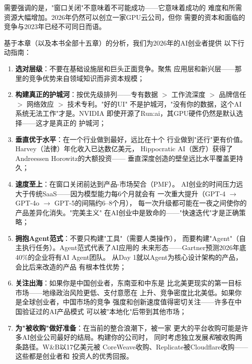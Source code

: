需要强调的是，"窗口关闭"不意味着不可能成功——它意味着成功的
难度和所需资源大幅增加。2026年仍然可以创立一家GPU云公司，但你
需要的资本和面临的竞争与2023年已经不可同日而语。

\begin{keybox}[写给AI创业者的行动指南]
基于本章（以及本书全部十五章）的分析，我们为2026年的AI创业者提供
以下行动指南：
\begin{enumerate}
  \item \textbf{选对层级}：不要在基础设施层和巨头正面竞争。聚焦
    应用层和新兴层——那里的竞争优势来自领域知识而非资本规模；

  \item \textbf{构建真正的护城河}：按优先级排列——专有数据 $>$
    工作流深度 $>$ 品牌信任 $>$ 网络效应 $>$ 技术专利。"好的UI"
    不是护城河，"没有你的数据，这个AI系统无法工作"才是。NVIDIA
    即使开源了Run:ai，其GPU硬件仍然是默认选择——这才是真正的
    护城河；

  \item \textbf{垂直优于水平}：在一个行业做到最好，远比在十个
    行业做到"还行"更有价值。Harvey（法律）年化收入已达数亿美元，
    Hippocratic AI（医疗）获得了Andreessen Horowitz的大额投资——
    垂直深度创造的壁垒远比水平覆盖更持久；

  \item \textbf{速度至上}：在窗口关闭前达到产品-市场契合（PMF）。
    AI创业的时间压力远大于传统SaaS——因为模型能力每6个月就会有
    一次重大提升（GPT-4 $\to$ GPT-4o $\to$ GPT-5的间隔约6--8个月），
    每一次升级都可能在一夜之间使你的产品差异化消失。"完美主义"
    在AI创业中是致命的——"快速迭代"才是正确策略；

  \item \textbf{拥抱Agent范式}：不要只构建"工具"（需要人类操作），
    而要构建"Agent"（自主执行任务）。Agent范式代表了AI应用的
    未来形态——Gartner预测2026年底40\%的企业将有AI Agent团队。
    从Day 1就以Agent为核心设计架构的产品，会比后来改造的产品
    有根本性优势；

  \item \textbf{关注出海}：如果你是中国创业者，东南亚和中东是
    比北美更现实的第一目标市场——地缘政治风险更低、支付意愿在
    上升、竞争密度比北美低。如果你是全球创业者，中国市场的竞争
    强度和创新速度值得密切关注——许多在中国验证过的AI产品模式
    可以被"本地化"后带到其他市场；

  \item \textbf{为"被收购"做好准备}：在当前的整合浪潮下，被一家
    更大的平台收购可能是许多AI创业公司最好的结局。构建你的公司时，
    同时考虑独立发展\emph{和}被收购两条路径。W\&B以17亿美元被
    CoreWeave收购、Replicate被Cloudflare收购——这些都是创业者和
    投资人的优秀回报。
\end{enumerate}
\end{keybox}

